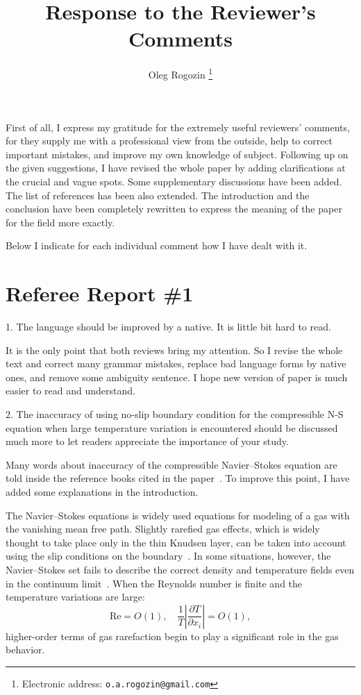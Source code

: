 \documentclass{article}
\title{Response to the Reviewer's Comments}
\author{Oleg Rogozin%
    \thanks{Electronic address: \texttt{o.a.rogozin@gmail.com}}
}
\newcommand{\pder}[2][]{\frac{\partial#1}{\partial#2}}
\begin{document}
\maketitle

First of all, I express my gratitude for the extremely useful reviewers'
comments, for they supply me with a professional view from the outside,
help to correct important mistakes, and improve my own knowledge of
subject. Following up on the given suggestions, I have revised the whole
paper by adding clarifications at the crucial and vague spots. Some
supplementary discussions have been added. The list of references has
been also extended. The introduction and the conclusion have been
completely rewritten to express the meaning of the paper for the field
more exactly.

Below I indicate for each individual comment how I have dealt with it.

\section{Referee Report \#1}

\begin{quoting}
1. The language should be improved by a native. It is little bit hard to
read.
\end{quoting}

It is the only point that both reviews bring my attention. So I revise
the whole text and correct many grammar mistakes, replace bad language
forms by native ones, and remove some ambiguity sentence. I hope new
version of paper is much easier to read and understand.

\begin{quoting}
2. The inaccuracy of using no-slip boundary condition for the
compressible N-S equation when large temperature variation is
encountered should be discussed much more to let readers appreciate the
importance of your study.
\end{quoting}

Many words about inaccuracy of the compressible Navier--Stokes equation
are told inside the reference books cited in the paper~\cite{Sone2002, Sone2007}.
To improve this point, I have added some explanations in the introduction.

\begin{leftbar}
The Navier--Stokes equations is widely used equations for modeling of a
gas with the vanishing mean free path. Slightly rarefied gas effects,
which is widely thought to take place only in the thin Knudsen layer,
can be taken into account using the slip conditions on the
boundary~\cite{SharipovCoefficients}. In some situations, however, the
Navier--Stokes set fails to describe the correct density and temperature
fields even in the continuum limit~\cite{Kogan1976, GhostEffect}. When
the Reynolds number is finite and the temperature variations are large:
\[ \mathrm{Re} = O(1), \quad \frac1T\left|\pder[T]{x_i}\right| = O(1), \]
higher-order terms of gas rarefaction begin to play a significant
role in the gas behavior.
\end{leftbar}
\end{document}
